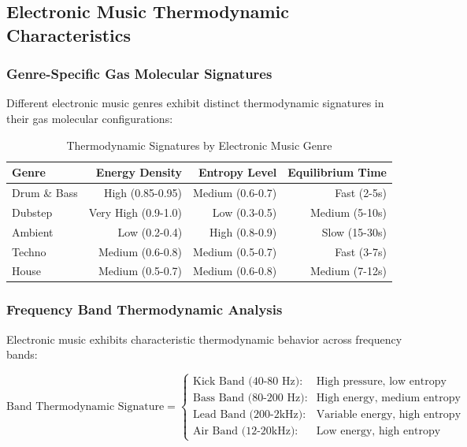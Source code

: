 \subsection{Electronic Music Thermodynamic Characteristics}

\subsubsection{Genre-Specific Gas Molecular Signatures}

Different electronic music genres exhibit distinct thermodynamic signatures in their gas molecular configurations:

\begin{table}[H]
\centering
\caption{Thermodynamic Signatures by Electronic Music Genre}
\begin{tabular}{@{}lrrr@{}}
\toprule
\textbf{Genre} & \textbf{Energy Density} & \textbf{Entropy Level} & \textbf{Equilibrium Time} \\
\midrule
Drum \& Bass & High (0.85-0.95) & Medium (0.6-0.7) & Fast (2-5s) \\
Dubstep & Very High (0.9-1.0) & Low (0.3-0.5) & Medium (5-10s) \\
Ambient & Low (0.2-0.4) & High (0.8-0.9) & Slow (15-30s) \\
Techno & Medium (0.6-0.8) & Medium (0.5-0.7) & Fast (3-7s) \\
House & Medium (0.5-0.7) & Medium (0.6-0.8) & Medium (7-12s) \\
\bottomrule
\end{tabular}
\end{table}

\subsubsection{Frequency Band Thermodynamic Analysis}

Electronic music exhibits characteristic thermodynamic behavior across frequency bands:

\begin{equation}
\text{Band Thermodynamic Signature} = \begin{cases}
\text{Kick Band (40-80 Hz):} & \text{High pressure, low entropy} \\
\text{Bass Band (80-200 Hz):} & \text{High energy, medium entropy} \\
\text{Lead Band (200-2kHz):} & \text{Variable energy, high entropy} \\
\text{Air Band (12-20kHz):} & \text{Low energy, high entropy}
\end{cases}
\end{equation}

